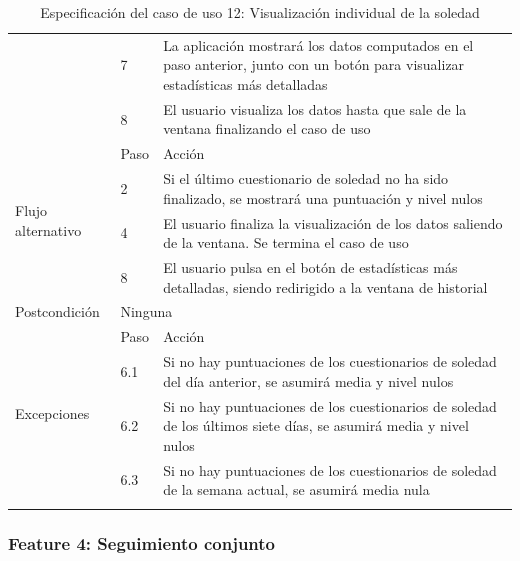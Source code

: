 \begin{table}[h]
\begin{tabularx}{\textwidth}{|l|l|X|}
            \cline{2-3} & 7 & La aplicación mostrará los datos computados en el paso anterior, junto con un botón para visualizar estadísticas más detalladas \\
            \cline{2-3} & 8 & El usuario visualiza los datos hasta que sale de la ventana finalizando el caso de uso \\
            \hline
            \multirow{4}{*}{Flujo alternativo} & Paso & Acción \\
            \cline{2-3} & 2 & Si el último cuestionario de soledad no ha sido finalizado, se mostrará una puntuación y nivel nulos \\
            \cline{2-3} & 4 & El usuario finaliza la visualización de los datos saliendo de la ventana. Se termina el caso de uso \\
            \cline{2-3} & 8 & El usuario pulsa en el botón de estadísticas más detalladas, siendo redirigido a la ventana de historial \\
            \hline
            Postcondición & \multicolumn{2}{|X|}{Ninguna} \\
            \hline
            \multirow{4}{*}{Excepciones}  & Paso & Acción \\
            \cline{2-3} & 6.1 & Si no hay puntuaciones de los cuestionarios de soledad del día anterior, se asumirá media y nivel nulos \\
            \cline{2-3} & 6.2 & Si no hay puntuaciones de los cuestionarios de soledad de los últimos siete días, se asumirá media y nivel nulos \\
            \cline{2-3} & 6.3 & Si no hay puntuaciones de los cuestionarios de soledad de la semana actual, se asumirá media nula \\
            \hline
            \caption{Especificación del caso de uso 12: Visualización individual de la soledad}
            \label{tabla:casos_uso:visualizacion_individual_soledad}
        \end{tabularx}
    \end{table}

    
    \subsubsection{Feature 4: Seguimiento conjunto}

